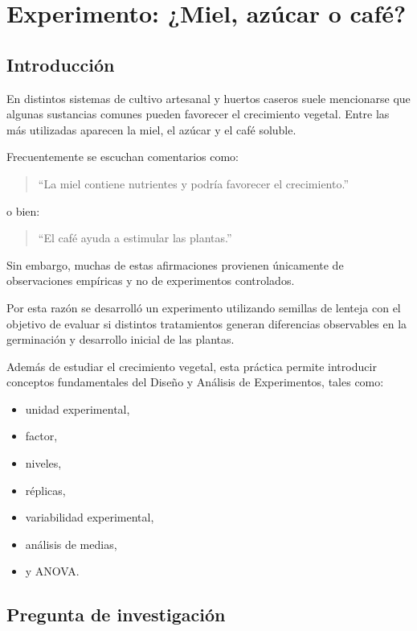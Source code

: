 \section{Experimento: ¿Miel, azúcar o café?}

\subsection{Introducción}

En distintos sistemas de cultivo artesanal y huertos caseros suele mencionarse que algunas sustancias comunes pueden favorecer el crecimiento vegetal. Entre las más utilizadas aparecen la miel, el azúcar y el café soluble.

Frecuentemente se escuchan comentarios como:

\begin{quote}
“La miel contiene nutrientes y podría favorecer el crecimiento.”
\end{quote}

o bien:

\begin{quote}
“El café ayuda a estimular las plantas.”
\end{quote}

Sin embargo, muchas de estas afirmaciones provienen únicamente de observaciones empíricas y no de experimentos controlados.

Por esta razón se desarrolló un experimento utilizando semillas de lenteja con el objetivo de evaluar si distintos tratamientos generan diferencias observables en la germinación y desarrollo inicial de las plantas.

Además de estudiar el crecimiento vegetal, esta práctica permite introducir conceptos fundamentales del Diseño y Análisis de Experimentos, tales como:

\begin{itemize}
    \item unidad experimental,
    \item factor,
    \item niveles,
    \item réplicas,
    \item variabilidad experimental,
    \item análisis de medias,
    \item y ANOVA.
\end{itemize}

\subsection{Pregunta de investigación}

